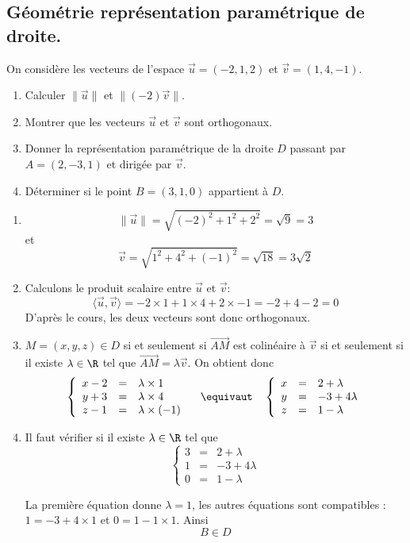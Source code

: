\subsection{Géométrie représentation paramétrique de droite.}


\begin{exercice}
On considère les vecteurs de l'espace $\vec{u} =(-2,1,2)$ et $\vec{v} =(1,4,-1)$.
\begin{enumerate}
\item Calculer $\|\vec{u} \|$ et $\| (-2) \vec{v}\|$.
\item Montrer que les vecteurs $\vec{u}$ et $\vec{v}$ sont orthogonaux. 
\item Donner la représentation paramétrique de la droite $D$ passant par $A= (2,-3,1)$ et dirigée par $\vec{v}$. 
\item Déterminer si le point $B=(3,1,0)$ appartient à $D$.  
\end{enumerate} 
\end{exercice}

\begin{correction}
\begin{enumerate}
\item $$\|\vec{u} \| = \sqrt{ (-2)^2+1^2 +2^2 }= \sqrt{ 9}=3$$
et 
$$ \vec{v}= \sqrt{ 1^2+4^2 +(-1)^2 }= \sqrt{ 18}=3\sqrt{2}$$
\item Calculons le produit scalaire entre $\vec{u}$ et $\vec{v}$:  $$\langle \vec{u}, \vec{v}\rangle = -2 \times 1 + 1 \times 4 +2\times -1  = -2+4-2=0$$
D'après le cours, les deux vecteurs sont donc orthogonaux. 
\item $M=(x,y,z)\in D$ si et seulement si $\vec{AM}$ est colinéaire à $\vec{v}$ si et seulement si il existe $\lambda \in \R $ tel que $\vec{AM} = \lambda \vec{v}$. On obtient donc 
$$\left\{ \begin{array}{ccl}
x-2&=&\lambda \times 1\\
y+3&=&\lambda \times 4\\
z-1&=&\lambda \times (-1)
\end{array}\right.  \quad \equivaut \quad \left\{ \begin{array}{ccl}
x&=&2+\lambda \\
y&=&-3+4\lambda \\
z&=&1-\lambda 
\end{array}\right.  $$

\item Il faut vérifier si il existe $\lambda \in \R$ tel que 
$$\left\{ \begin{array}{ccl}
3&=&2+\lambda \\
1&=&-3+4\lambda \\
0&=&1-\lambda 
\end{array}\right.  $$

La première équation donne $\lambda=1$, les autres équations sont compatibles : $1 = -3+4\times 1 $ et $ 0 = 1- 1\times 1$.  Ainsi $$B\in D$$
\end{enumerate} 
\end{correction}